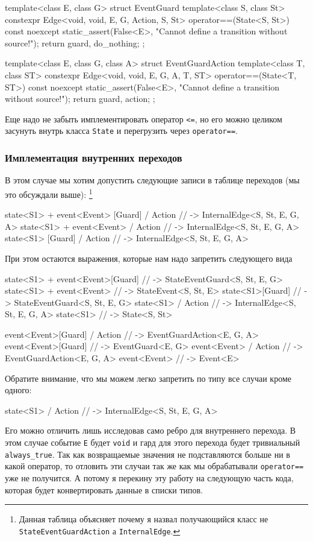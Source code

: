 \documentclass{article}
\begin{document}
{\begin{cppcode}[\nonumbers]
template<class E, class G>
struct EventGuard {
  template<class S, class St>
  constexpr Edge<void, void, E, G, Action, S, St> operator==(State<S, St>) const noexcept {
    static_assert(False<E>, "Cannot define a transition without source!");
    return {guard, do_nothing};
  }
};

template<class E, class G, class A>
struct EventGuardAction  {
  template<class T, class ST>
  constexpr Edge<void, void, E, G, A, T, ST>  operator==(State<T, ST>) const noexcept {
    static_assert(False<E>, "Cannot define a transition without source!");
    return {guard, action};
  }
};
\end{cppcode}
Еще надо не забыть имплементировать оператор \verb"<=", но его можно целиком засунуть внутрь класса \verb"State" и перегрузить через \verb"operator==".

\subsubsection{Имплементация внутренних переходов}

В этом случае мы хотим допустить следующие записи в таблице переходов (мы это обсуждали выше):%
\footnote{Данная таблица объясняет почему я назвал получающийся класс не \texttt{StateEventGuardAction} а \texttt{InternalEdge}.}
\begin{cppcode}[\nonumbers]
state<S1> + event<Event> [Guard] / Action // -> InternalEdge<S, St, E, G, A>
state<S1> + event<Event> / Action         // -> InternalEdge<S, St, E, G, A>
state<S1> [Guard] / Action                // -> InternalEdge<S, St, E, G, A>
\end{cppcode}
При этом остаются выражения, которые нам надо запретить следующего вида
\begin{cppcode}[\nonumbers]
state<S1> + event<Event>[Guard] // -> StateEventGuard<S, St, E, G>
state<S1> + event<Event>        // -> StateEvent<S, St, E>
state<S1>[Guard]                // -> StateEventGuard<S, St, E, G>
state<S1> / Action              // -> InternalEdge<S, St, E, G, A>
state<S1>                       // -> State<S, St>

event<Event>[Guard] / Action    // -> EventGuardAction<E, G, A>
event<Event>[Guard]             // -> EventGuard<E, G>
event<Event> / Action           // -> EventGuardAction<E, G, A>
event<Event>                    // -> Event<E>
\end{cppcode}
Обратите внимание, что мы можем легко запретить по типу все случаи кроме одного:
\begin{cppcode}[\nonumbers]
state<S1> / Action              // -> InternalEdge<S, St, E, G, A>
\end{cppcode}
Его можно отличить лишь исследовав само ребро для внутреннего перехода.
В этом случае событие \verb"E" будет \verb"void" и гард для этого перехода будет тривиальный \verb"always_true".
Так как возвращаемые значения не подставляются больше ни в какой оператор, то отловить эти случаи так же как мы обрабатывали \verb"operator==" уже не получится.
А потому я перекину эту работу на следующую часть кода, которая будет конвертировать данные в списки типов.

}
\end{document}
